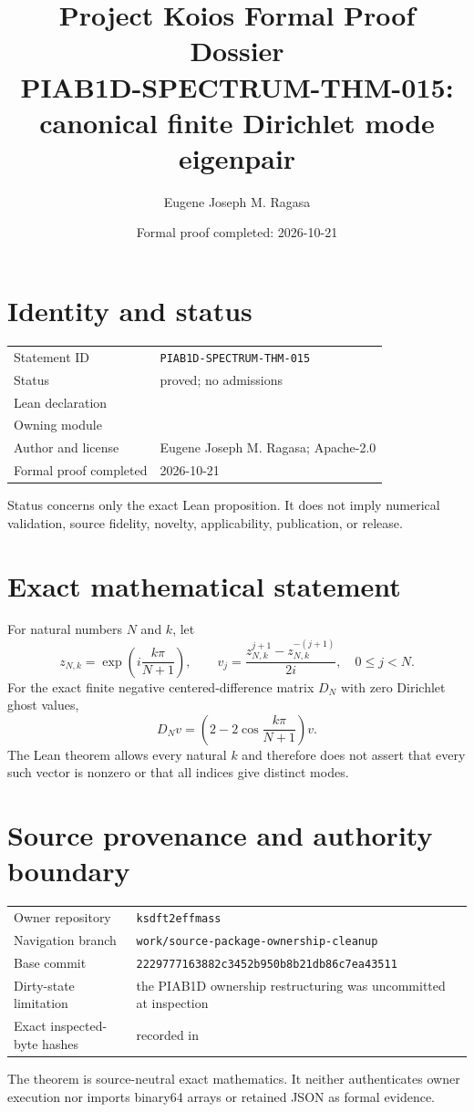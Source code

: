 \documentclass[11pt]{article}
\title{Project Koios Formal Proof Dossier\\\large PIAB1D-SPECTRUM-THM-015: canonical finite Dirichlet mode eigenpair}
\author{Eugene Joseph M. Ragasa}
\date{Formal proof completed: 2026-10-21}
\begin{document}
\maketitle

\section{Identity and status}
\begin{tabularx}{\textwidth}{@{}lY@{}}\toprule
Statement ID & \texttt{PIAB1D-SPECTRUM-THM-015} \\
Status & proved; no admissions \\
Lean declaration &  \\
Owning module &  \\
Author and license & Eugene Joseph M. Ragasa; Apache-2.0 \\
Formal proof completed & 2026-10-21 \\
\bottomrule\end{tabularx}
Status concerns only the exact Lean proposition. It does not imply numerical validation,
source fidelity, novelty, applicability, publication, or release.

\section{Exact mathematical statement}
For natural numbers $N$ and $k$, let
\[
 z_{N,k}=\exp\!\left(i\frac{k\pi}{N+1}\right),\qquad
 v_j=\frac{z_{N,k}^{j+1}-z_{N,k}^{-(j+1)}}{2i},\quad 0\leq j<N.
\]
For the exact finite negative centered-difference matrix $D_N$ with zero Dirichlet ghost
values,
\[
 D_Nv=\left(2-2\cos\frac{k\pi}{N+1}\right)v.
\]
The Lean theorem allows every natural $k$ and therefore does not assert that every such vector
is nonzero or that all indices give distinct modes.

\section{Source provenance and authority boundary}
\begin{tabularx}{\textwidth}{@{}lY@{}}\toprule
Owner repository & \texttt{ksdft2effmass} \\
Navigation branch & \texttt{work/source-package-ownership-cleanup} \\
Base commit & \texttt{2229777163882c3452b950b8b21db86c7ea43511} \\
Dirty-state limitation & the PIAB1D ownership restructuring was uncommitted at inspection \\
Exact inspected-byte hashes & recorded in  \\
\bottomrule\end{tabularx}
The theorem is source-neutral exact mathematics. It neither authenticates owner execution nor
imports binary64 arrays or retained JSON as formal evidence.
\end{document}
